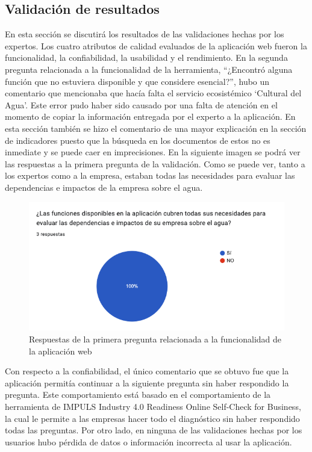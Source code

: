 \subsection{Validación de resultados}
En esta sección se discutirá los resultados de las validaciones hechas por los expertos. Los cuatro atributos de calidad evaluados de la aplicación web fueron la funcionalidad, la confiabilidad, la usabilidad y el rendimiento. En la segunda pregunta relacionada a la funcionalidad de la herramienta, “¿Encontró alguna función que no estuviera disponible y que considere esencial?”, hubo un comentario que mencionaba que hacía falta el servicio ecosistémico ‘Cultural del Agua’. Este error pudo haber sido causado por una falta de atención en el momento de copiar la información entregada por el experto a la aplicación.  En esta sección también se hizo el comentario de una mayor explicación en la sección de indicadores puesto que la búsqueda en los documentos de estos no es inmediate y se puede caer en imprecisiones. En la siguiente imagen se podrá ver las respuestas a la primera pregunta de la validación. Como se puede ver, tanto a los expertos como a la empresa, estaban todas las necesidades para evaluar las dependencias e impactos de la empresa sobre el agua.

\begin{figure}[H]
        \centering
        \includegraphics[scale=0.45]{images/6-validacion/1-funcionalidad.png}
        \caption{Respuestas de la primera pregunta relacionada a la funcionalidad de la aplicación web}
 \end{figure}

Con respecto a la confiabilidad, el único comentario que se obtuvo fue que la aplicación permitía continuar a la siguiente pregunta sin haber respondido la pregunta. Este comportamiento está basado en el comportamiento de la herramienta de IMPULS Industry 4.0 Readiness Online Self-Check for Business, la cual le permite a las empresas hacer todo el diagnóstico sin haber respondido todas las preguntas. Por otro lado, en ninguna de las validaciones hechas por los usuarios hubo pérdida de datos o información incorrecta al usar la aplicación.

